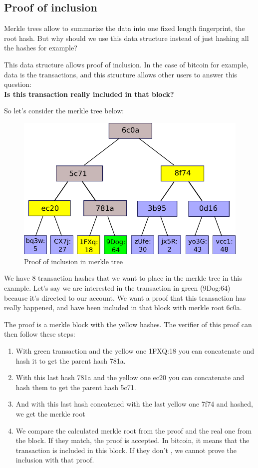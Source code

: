 \subsection{Proof of inclusion} \label{merkle:inclusion}
Merkle trees allow to summarize the data into one fixed length fingerprint, the root hash. 
But why should we use this data structure instead of just hashing all the hashes for example?

This data structure allows proof of inclusion. In the case of bitcoin for example, data is the transactions, and this structure allows other users to answer this question: \\
\textbf{Is this transaction really included in that block?}

So let's consider the merkle tree below:

\begin{figure}[H]
  \centering
\includegraphics[width=0.5\linewidth]{background/merkle_proofs_2.png}
\caption{Proof of inclusion in merkle tree}
\end{figure}

We have 8 transaction hashes that we want to place in the merkle tree in this example. Let's say we are interested in the transaction in green (9Dog:64) because it's directed to our account. We want a proof that this transaction has really happened, and have been included in that block with merkle root 6c0a. 

The proof is a merkle block with the yellow hashes. The verifier of this proof can then follow these steps:
\begin{enumerate}
    \item With green transaction and the yellow one 1FXQ:18 you can concatenate and hash it to get the parent hash 781a.
    \item With this last hash 781a and the yellow one ec20 you can concatenate and hash them to get the parent hash 5c71.
    \item And with this last hash concatened with the last yellow one 7f74 and hashed, we get the merkle root
    \item We compare the calculated merkle root from the proof and the real one from the block. If they match, the proof is accepted.
    In bitcoin, it means that the transaction is included in this block. If they don't , we cannot prove the inclusion with that proof. 
\end{enumerate} 

